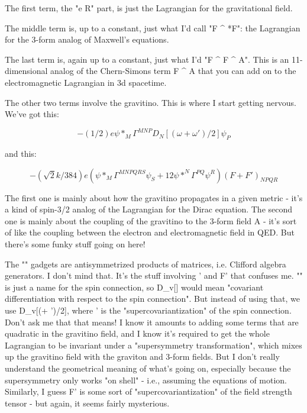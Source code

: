 The first term, the "e R" part, is just the Lagrangian for the 
gravitational field. 
 
The middle term is, up to a constant, just what I'd call "F ^
*F": the Lagrangian for the 3-form analog of Maxwell's equations.
 
The last term is, again up to a constant, just what I'd "F ^ F ^
A".  This is an 11-dimensional analog of the Chern-Simons term F ^
A that you can add on to the electromagnetic Lagrangian in 3d spacetime.
 
The other two terms involve the gravitino.  This is where I start getting 
nervous.  We've got this: 
 

$$

    - (1/2) e \psi *_{M} \Gamma ^{MNP} D_{N}[(\omega  + \omega ')/2] \psi _{P}
 
$$
    
and this: 
 

$$

     - (\sqrt 2k/384) e (\psi *_{M} \Gamma ^{MNPQRS} \psi _{S} + 12 \psi *^{N} \Gamma ^{PQ} \psi ^{R}) (F + F')_{NPQR} 
$$
    
The first one is mainly about how the gravitino propagates in a given 
metric - it's a kind of spin-3/2 analog of the Lagrangian for the Dirac 
equation.  The second one is mainly about the coupling of the gravitino 
to the 3-form field A - it's sort of like the coupling between the electron 
and electromagnetic field in QED.  But there's some funky stuff going on 
here!   
 
The "\Gamma " gadgets are antisymmetrized products of \gamma 
matrices, i.e. Clifford algebra generators.  I don't mind that.  It's
the stuff involving \omega ' and F' that confuses me.  "\omega "
is just a name for the spin connection, so D_{v}[\omega ] would mean
"covariant differentiation with respect to the spin
connection".  But instead of using that, we use D_{v}[(\omega  +
\omega ')/2], where \omega ' is the "supercovariantization" of the
spin connection.  Don't ask me that that means!  I know it amounts to
adding some terms that are quadratic in the gravitino field, and I know
it's required to get the whole Lagrangian to be invariant under a
"supersymmetry transformation", which mixes up the gravitino
field with the graviton and 3-form fields.  But I don't really
understand the geometrical meaning of what's going on, especially
because the supersymmetry only works "on shell" - i.e.,
assuming the equations of motion.  Similarly, I guess F' is some sort of
"supercovariantization" of the field strength tensor - but
again, it seems fairly mysterious.
 
